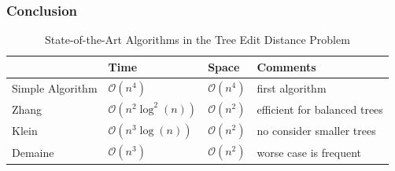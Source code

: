 \documentclass{beamer}
\begin{document}
\begin{frame}
\frametitle{Conclusion}
\begin{table}
			\centering
			\begin{tabular}{l l l l}
				\toprule
				\textbf{} & \textbf{Time} & \textbf{Space} & \textbf{Comments}\\

				\midrule
				Simple Algorithm &  $\mathcal{O}(n^4)$ & $\mathcal{O}(n^4)$ & first algorithm\\
				Zhang & $\mathcal{O}(n^2\log^2(n))$ & $\mathcal{O}(n^2)$ & efficient for balanced trees \\
				Klein &  $\mathcal{O}(n^3\log(n))$ & $\mathcal{O}(n^2)$ &  no consider smaller trees\\
				Demaine &  $\mathcal{O}(n^3)$ & $\mathcal{O}(n^2)$ & worse case is frequent\\
			\end{tabular}
		\caption{State-of-the-Art Algorithms in the Tree Edit Distance Problem}
\end{table}
\end{frame}
\end{document}
